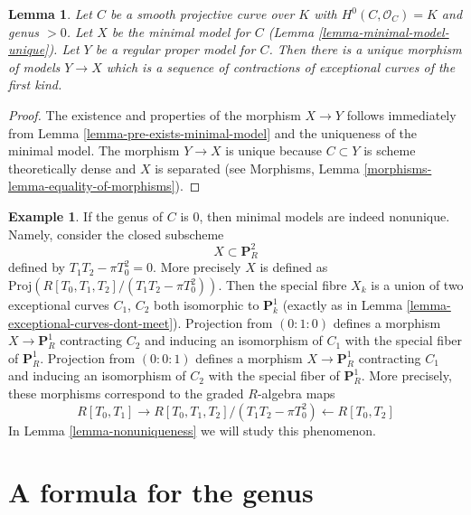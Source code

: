 \documentclass{stacks-project}
\theoremstyle{plain}
\newtheorem{lemma}[subsection]{Lemma}
\theoremstyle{definition}
\newtheorem{example}[subsection]{Example}
\theoremstyle{remark}
\numberwithin{equation}{subsection}
\begin{document}
\begin{lemma}
\label{lemma-minimal-model-mapping-property}
Let $C$ be a smooth projective curve over $K$ with $H^0(C, \mathcal{O}_C) = K$
and genus $> 0$. Let $X$ be the minimal model for $C$
(Lemma \ref{lemma-minimal-model-unique}).
Let $Y$ be a regular proper model for $C$. Then there is a unique
morphism of models $Y \to X$ which is a sequence of contractions of
exceptional curves of the first kind.
\end{lemma}

\begin{proof}
The existence and properties of the morphism $X \to Y$
follows immediately from Lemma \ref{lemma-pre-exists-minimal-model}
and the uniqueness of the minimal model.
The morphism $Y \to X$ is unique because
$C \subset Y$ is scheme theoretically dense and $X$ is separated
(see Morphisms, Lemma \ref{morphisms-lemma-equality-of-morphisms}).
\end{proof}

\begin{example}
\label{example-nonunique-in-genus-zero}
If the genus of $C$ is $0$, then minimal models are indeed nonunique.
Namely, consider the closed subscheme
$$
X \subset \mathbf{P}^2_R
$$
defined by $T_1T_2 - \pi T_0^2 = 0$. More precisely $X$ is defined
as $\text{Proj}(R[T_0, T_1, T_2]/(T_1T_2 - \pi T_0^2))$. Then the
special fibre $X_k$ is a union of two exceptional curves $C_1$, $C_2$ both
isomorphic to $\mathbf{P}^1_k$
(exactly as in Lemma \ref{lemma-exceptional-curves-dont-meet}).
Projection from $(0 : 1 : 0)$ defines a morphism $X \to \mathbf{P}^1_R$
contracting $C_2$ and inducing an isomorphism of $C_1$ with the special
fiber of $\mathbf{P}^1_R$. Projection from $(0 : 0 : 1)$ defines a
morphism $X \to \mathbf{P}^1_R$ contracting $C_1$ and inducing an
isomorphism of $C_2$ with the special fiber of $\mathbf{P}^1_R$.
More precisely, these morphisms correspond to the graded $R$-algebra
maps
$$
R[T_0, T_1] \longrightarrow
R[T_0, T_1, T_2]/(T_1T_2 - \pi T_0^2) \longleftarrow
R[T_0, T_2]
$$
In Lemma \ref{lemma-nonuniqueness} we will study this phenomenon.
\end{example}








\section{A formula for the genus}
\label{section-genus-formula}
\end{document}
